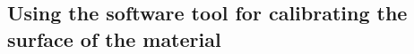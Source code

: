 \documentclass[10pt,a4paper]{report}
\begin{document}
\begin{appendices}
%
%
%
%
%
%
%
%
%
%
%
%
%
%
%
%
%
%
\newpage

\newpage

\chapter{ Using the software tool for calibrating the surface of the material}


\end{appendices}
\end{document}
